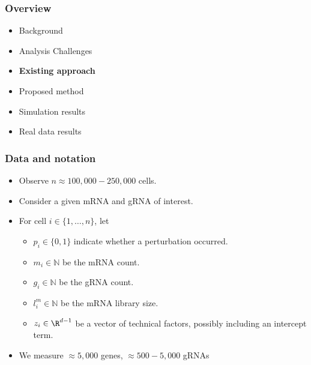 \documentclass{beamer}
\begin{document}




\begin{frame}
\frametitle{Overview}
\begin{itemize}
	\item Background
	\item Analysis Challenges
	\item \textbf{Existing approach}
	\item Proposed method
	\item Simulation results
	\item Real data results
\end{itemize}
\end{frame}


\begin{frame}
\frametitle{Data and notation}

\begin{itemize}
\item Observe $n \approx 100,000 - 250,000$ cells.
\item Consider a given mRNA and gRNA of interest.
\item For cell $i \in \{1, \dots, n\}$, let 
\begin{itemize}
\item $p_i \in \{0, 1\}$ indicate whether a perturbation occurred. 
\item $m_i \in \mathbb{N}$ be the mRNA count.
\item $g_i \in \mathbb{N}$ be the gRNA count.
\item $l^m_i \in \mathbb{N}$ be the mRNA library size.
\item $z_i \in \R^{d-1}$ be a vector of technical factors, possibly including an intercept term.
\end{itemize}
\item We measure $\approx5,000$ genes, $\approx500 - 5,000$ gRNAs
\end{itemize}
\end{frame}
\end{document}
